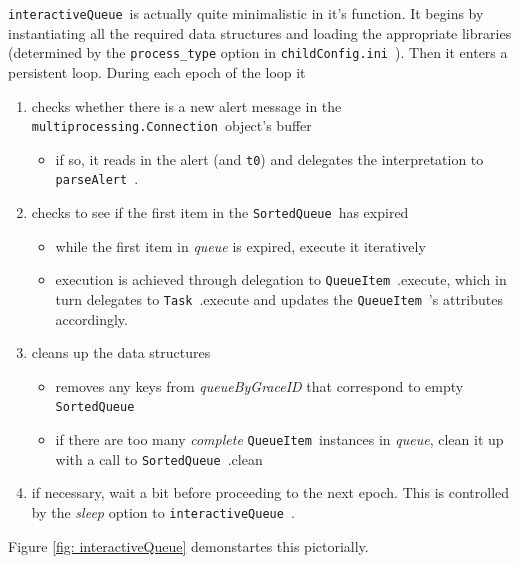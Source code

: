 \documentclass{article}
\newcommand{\multiprocessingConnection}{\texttt{multiprocessing.Connection}~}
\newcommand{\interactiveQueue}{\texttt{interactiveQueue}~}
\newcommand{\parseAlert}{\texttt{parseAlert}~}
\newcommand{\SortedQueue}{\texttt{SortedQueue}~}
\newcommand{\QueueItem}{\texttt{QueueItem}~}
\newcommand{\Task}{\texttt{Task}~}
\newcommand{\childConfigini}{\texttt{childConfig.ini}~}
\begin{document}
\interactiveQueue is actually quite minimalistic in it's function. 
It begins by instantiating all the required data structures and loading the appropriate libraries (determined by the \texttt{process\_type} option in \childConfigini).
Then it enters a persistent loop.
During each epoch of the loop it
\begin{enumerate}
    \item{checks whether there is a new alert message in the \multiprocessingConnection object's buffer
        \begin{itemize}
            \item{if so, it reads in the alert (and \texttt{t0}) and delegates the interpretation to \parseAlert.}
        \end{itemize}
         }
    \item{checks to see if the first item in the \SortedQueue has expired
        \begin{itemize}
            \item{while the first item in \textit{queue} is expired, execute it iteratively}
            \item{execution is achieved through delegation to \QueueItem.execute, which in turn delegates to \Task.execute and updates the \QueueItem's attributes accordingly.}
        \end{itemize}
         }
    \item{cleans up the data structures
        \begin{itemize}
            \item{removes any keys from \textit{queueByGraceID} that correspond to empty \SortedQueue}
            \item{if there are too many \textit{complete} \QueueItem instances in \textit{queue}, clean it up with a call to \SortedQueue.clean}
        \end{itemize}
         }
    \item{if necessary, wait a bit before proceeding to the next epoch. This is controlled by the \textit{sleep} option to \interactiveQueue.}
\end{enumerate}
Figure \ref{fig: interactiveQueue} demonstartes this pictorially.
\end{document}
